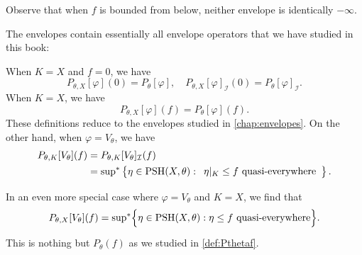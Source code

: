Observe that when $f$ is bounded from below, neither envelope is identically $-\infty$.



The envelopes contain essentially all envelope operators that we have studied in this book:
\begin{example}\label{ex:rel_env_cases}
    When $K=X$ and $f=0$, we have
    \[
        P_{\theta,X}[\varphi](0)=P_{\theta}[\varphi],\quad P_{\theta,X}[\varphi]_{\mathcal{I}}(0)=P_{\theta}[\varphi]_{\mathcal{I}}.
    \]
    When $K=X$, we have
    \[
        P_{\theta,X}[\varphi](f)=P_{\theta}[\varphi](f).
    \]
    These definitions reduce to the envelopes studied in \cref{chap:envelopes}.
    On the other hand, when $\varphi=V_{\theta}$, we have
    \[
    \begin{aligned}
        P_{\theta,K}[V_{\theta}](f)
        &=P_{\theta,K}[V_{\theta}]_{\mathcal{I}}(f)\\
        &=\operatorname*{sup}_{}{}\!{}^{*} \left\{ \eta \in \mathrm{PSH}(X,\theta):
        \begin{array}{l}
        \eta|_K \leq f \textup{ quasi-everywhere}
        \end{array}
        \right\}.
    \end{aligned}
    \]
    In an even more special case where $\varphi=V_{\theta}$ and $K=X$, we find that
    \[
        P_{\theta,X}[V_{\theta}](f)=\operatorname*{sup}_{}{}\!{}^{*} \Bigl\{ \eta \in \mathrm{PSH}(X,\theta): \eta \leq f \textup{ quasi-everywhere}\Bigr\}.
    \]
    This is nothing but $P_{\theta}(f)$ as we studied in \cref{def:Pthetaf}.
\end{example}



